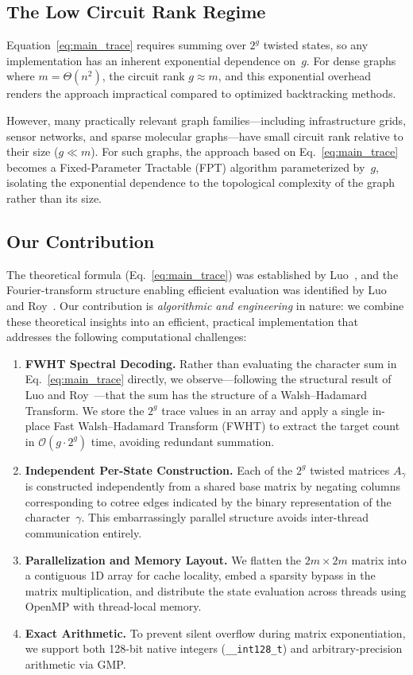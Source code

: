 \documentclass[acmsmall,review]{acmart}
\newcommand{\bigO}{\mathcal{O}}
\begin{document}
	\subsection{The Low Circuit Rank Regime}
	\label{sec:parameterizing}
	Equation~\eqref{eq:main_trace} requires summing over $2^g$ twisted states, so any implementation has an inherent exponential dependence on~$g$. For dense graphs where $m = \Theta(n^2)$, the circuit rank $g \approx m$, and this exponential overhead renders the approach impractical compared to optimized backtracking methods.
	
	However, many practically relevant graph families---including infrastructure grids, sensor networks, and sparse molecular graphs---have small circuit rank relative to their size ($g \ll m$). For such graphs, the approach based on Eq.~\eqref{eq:main_trace} becomes a Fixed-Parameter Tractable (FPT) algorithm parameterized by~$g$, isolating the exponential dependence to the topological complexity of the graph rather than its size.
	
	\subsection{Our Contribution}
	\label{sec:contribution}
	The theoretical formula (Eq.~\eqref{eq:main_trace}) was established by Luo~\cite{Luo2025}, and the Fourier-transform structure enabling efficient evaluation was identified by Luo and Roy~\cite{LR24}. Our contribution is \emph{algorithmic and engineering} in nature: we combine these theoretical insights into an efficient, practical implementation that addresses the following computational challenges:
	\begin{enumerate}
		\item \textbf{FWHT Spectral Decoding.} Rather than evaluating the character sum in Eq.~\eqref{eq:main_trace} directly, we observe---following the structural result of Luo and Roy~\cite{LR24}---that the sum has the structure of a Walsh--Hadamard Transform. We store the $2^g$ trace values in an array and apply a single in-place Fast Walsh--Hadamard Transform (FWHT) to extract the target count in $\bigO(g \cdot 2^g)$ time, avoiding redundant summation.
		\item \textbf{Independent Per-State Construction.} Each of the $2^g$ twisted matrices $A_\gamma$ is constructed independently from a shared base matrix by negating columns corresponding to cotree edges indicated by the binary representation of the character~$\gamma$. This embarrassingly parallel structure avoids inter-thread communication entirely.
		\item \textbf{Parallelization and Memory Layout.} We flatten the $2m \times 2m$ matrix into a contiguous 1D array for cache locality, embed a sparsity bypass in the matrix multiplication, and distribute the state evaluation across threads using OpenMP with thread-local memory.
		\item \textbf{Exact Arithmetic.} To prevent silent overflow during matrix exponentiation, we support both 128-bit native integers (\texttt{\_\_int128\_t}) and arbitrary-precision arithmetic via GMP.
	\end{enumerate}
	
\end{document}
